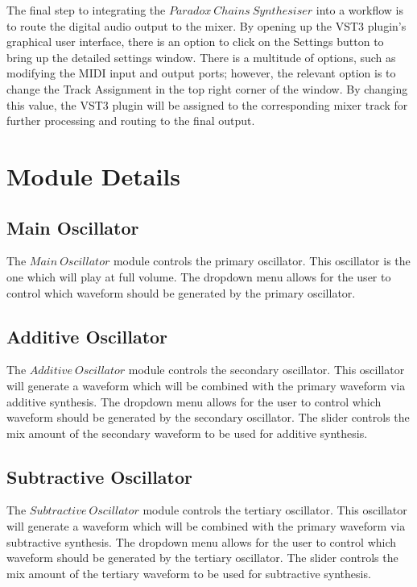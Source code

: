 \documentclass[a4paper,12pt]{report}
\begin{document}
The final step to integrating the $Paradox\ Chains\ Synthesiser$ into a workflow is to route the digital audio output to the mixer. By opening up the VST3 plugin's graphical user interface, there is an option to click on the Settings button to bring up the detailed settings window. There is a multitude of options, such as modifying the MIDI input and output ports; however, the relevant option is to change the Track Assignment in the top right corner of the window. By changing this value, the VST3 plugin will be assigned to the corresponding mixer track for further processing and routing to the final output.

\section{Module Details}
\label{sec:moduledetails}
\subsection{Main Oscillator}
\label{subsec:mainosc}
The $Main\ Oscillator$ module controls the primary oscillator. This oscillator is the one which will play at full volume. The dropdown menu allows for the user to control which waveform should be generated by the primary oscillator.


\subsection{Additive Oscillator}
\label{subsec:addosc}
The $Additive\ Oscillator$ module controls the secondary oscillator. This oscillator will generate a waveform which will be combined with the primary waveform via additive synthesis. The dropdown menu allows for the user to control which waveform should be generated by the secondary oscillator. The slider controls the mix amount of the secondary waveform to be used for additive synthesis.


\subsection{Subtractive Oscillator}
\label{subsec:subosc}
The $Subtractive\ Oscillator$ module controls the tertiary oscillator. This oscillator will generate a waveform which will be combined with the primary waveform via subtractive synthesis. The dropdown menu allows for the user to control which waveform should be generated by the tertiary oscillator. The slider controls the mix amount of the tertiary waveform to be used for subtractive synthesis.
\end{document}
